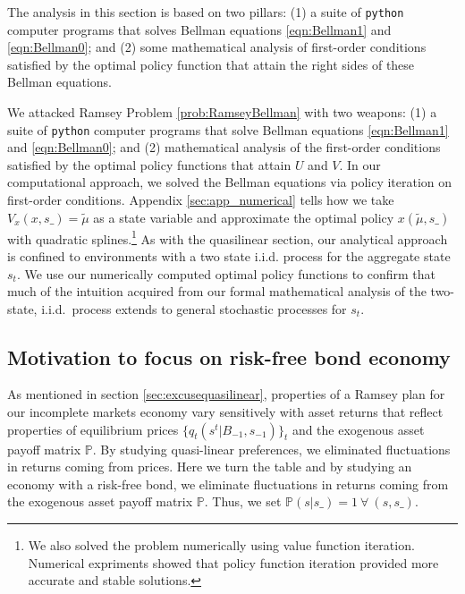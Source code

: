 \documentclass[12pt]{article}
\newcommand{\tjs}[1]{\textcolor{red}{$^{\textrm{tjs}}${#1}}}
\begin{document}
The analysis in this section is based on two pillars: (1) a suite of \texttt{python} computer programs that solves Bellman equations
\eqref{eqn:Bellman1} and \eqref{eqn:Bellman0}; and (2) some mathematical analysis of first-order conditions satisfied by
the  optimal policy function that attain the right sides of these Bellman equations.  

We attacked Ramsey  Problem \ref{prob:RamseyBellman} with two weapons: (1) a suite of \texttt{python} computer programs that solve Bellman equations \eqref{eqn:Bellman1} and \eqref{eqn:Bellman0};
and (2) mathematical analysis of the first-order conditions satisfied by the optimal policy functions that attain $U$ and $V$. In our computational approach,
we solved the Bellman equations via policy iteration on  first-order conditions.  Appendix \ref{sec:app_numerical} tells how we take $V_x(x,s\_) = \tilde{\mu}$ as a state variable
and approximate the optimal policy  $x(\tilde \mu,s\_)$ with quadratic splines.\footnote{We also solved the
problem numerically using value function iteration.  Numerical expriments showed that policy function iteration provided more accurate and stable solutions.} 
As with the quasilinear section, our analytical approach is confined to environments with a two state i.i.d. process for  the aggregate state $s_t$. 
We use our numerically computed optimal policy functions to confirm that much  of the  intuition  acquired from our formal mathematical analysis of the two-state, i.i.d.\ process 
extends to  general stochastic processes for $s_t$.

\subsection{Motivation to focus on risk-free bond economy\label{sec:riskfreeonly}}

As mentioned in section \ref{sec:excusequasilinear},  properties of a Ramsey plan for our incomplete markets economy vary sensitively  with   asset returns that reflect
	properties of equilibrium prices $\{q_t(s^t|B_{-1},s_{-1})\}_t$ and the exogenous asset payoff matrix $\mathbb{P}$.  By studying
quasi-linear preferences, we eliminated fluctuations in returns coming from prices.  Here we turn the table and by studying an economy
with a risk-free bond, we eliminate fluctuations in returns coming from the exogenous asset payoff matrix $\mathbb{P}$.
Thus, we set $\mathbb{P}(s|s\_)=1 \ \forall \ (s,s\_)$.
\end{document}
